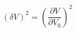 \begin{equation}
\label{eq:deltaV}
\left(\delta V\right)^2 = \left( \frac{\partial{V}}{\partial{V_0}}\right)^2 
\end{equation}